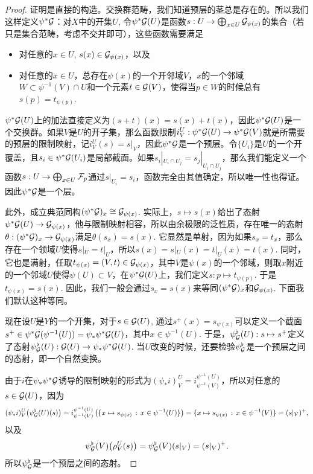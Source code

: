 \begin{proof} 
	证明是直接的构造。交换群范畴，我们知道预层的茎总是存在的。所以我们这样定义$\psi^*\mathcal{G}$：对$X$中的开集$U$, 令$\psi^*\mathcal{G}(U)$是函数$s:U\to \bigoplus_{x\in U}\mathcal{G}_{\psi(x)}$的集合（若只是集合范畴，考虑不交并即可），这些函数需要满足
	\begin{itemize}
		\item 对任意的$x\in U$, $s(x)\in \mathcal{G}_{\psi(x)}$，以及

		\item 对任意的$x\in U$，总存在$\psi(x)$的一个开邻域$V$，$x$的一个邻域$W\subset \psi^{-1}(V)\cap U$和一个元素$t\in \mathcal{G}(V)$，使得当$p\in W$的时候总有$s(p)=t_{\psi(p)}$.
	\end{itemize}
	$\psi^*\mathcal{G}(U)$上的加法直接定义为$(s+t)(x)=s(x)+t(x)$，因此$\psi^*\mathcal{G}(U)$是一个交换群。如果$V$是$U$的开子集，那么函数限制$i^U_V:\psi^*\mathcal{G}(U)\to \psi^*\mathcal{G}(V)$就是所需要的预层的限制映射，记$i^U_V(s)=s|_V$，因此$\psi^*\mathcal{G}$是一个预层。令$\{U_i\}$是$U$的一个开覆盖，且$s_i\in \psi^*\mathcal{G}(U_i)$是局部截面。如果$s_i|_{U_i\cap U_j}=s_j|_{U_i\cap U_j}$，那么我们能定义一个函数$s:U\to \bigoplus_{x\in U}\mathcal{F}_p$通过$s|_{U_i}=s_i$，函数完全由其值确定，所以唯一性也得证。因此$\psi^*\mathcal{G}$是一个层。

	此外，成立典范同构$(\psi^*\mathcal{G})_x\cong \mathcal{G}_{\psi(x)}$. 实际上，$s\mapsto s(x)$给出了态射$\psi^*\mathcal{G}(U)\to \mathcal{G}_{\psi(x)}$，他与限制映射相容，所以由余极限的泛性质，存在唯一的态射$\theta:(\psi^*\mathcal{G})_x\to \mathcal{G}_{\psi(x)}$满足$\theta(s_x)=s(x)$. 它显然是单射，因为如果$s_x=t_x$，那么存在一个领域$U$使得$s|_U=t|_U$，所以$s(x)=s|_U(x)=t|_U(x)=t(x)$. 同时，它也是满射，任取$t_{\psi(x)}=(V,t)\in \mathcal{G}_{\psi(x)}$，其中$V$是$\psi(x)$的一个邻域，则取$x$附近的一个邻域$U$使得$\psi(U)\subset V$，在$\psi^*\mathcal{G}(U)$上，我们定义$s:p\mapsto t_{\psi(p)}$. 于是$t_{\psi(x)}=s(x)$. 因此，我们一般会通过$s_x=s(x)$来等同$(\psi^*\mathcal{G})_x$和$\mathcal{G}_{\psi(x)}$. 下面我们默认这种等同。

	现在设$U$是$Y$的一个开集，对于$s\in \mathcal{G}(U)$, 通过$s^+(x)=s_{\psi(x)}$可以定义一个截面$s^+\in \psi^*\mathcal{G}(\psi^{-1}(U))=\psi_*\psi^*\mathcal{G}(U)$，其中$x\in \psi^{-1}(U)$. 于是，$\psi^\flat_{\mathcal{G}}(U):s\mapsto s^+$定义了态射$\psi^\flat_{\mathcal{G}}(U):\mathcal{G}(U)\to \psi_*\psi^*\mathcal{G}(U)$. 当$U$改变的时候，还要检验$\psi^\flat_{\mathcal{G}}$是一个预层之间的态射，即一个自然变换。

	由于$i$在$\psi_*\psi^*\mathcal{G}$诱导的限制映射的形式为$(\psi_* i)^U_V=i^{\psi^{-1}(U)}_{\psi^{-1}(V)}$，所以对任意的$s\in \mathcal{G}(U)$，因为
	\[
		(\psi_* i)^U_V\bigl(\psi^\flat_{\mathcal{G}}(U)(s)\bigr)=i^{\psi^{-1}(U)}_{\psi^{-1}(V)}\left(\{x\mapsto s_{\psi(x)}\,:\, x\in \psi^{-1}(U)\}\right)=\{x\mapsto s_{\psi(x)}\,:\, x\in \psi^{-1}(V)\}=(s|_V)^+,
	\]
	以及
	\[
		\psi^\flat_{\mathcal{G}}(V)\bigl(\rho^U_V(s)\bigr)=\psi^\flat_{\mathcal{G}}(V)(s|_V)=(s|_V)^+.
	\]
	所以$\psi^\flat_{\mathcal{G}}$是一个预层之间的态射。


\end{proof}
